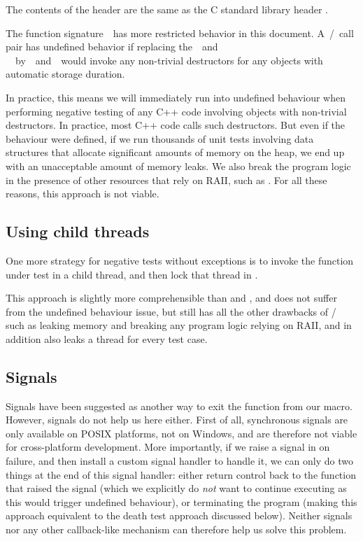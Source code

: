 \begin{adjustwidth}{0.5cm}{0.5cm}
The contents of the header  are the same as the C standard library header .

The function signature  has more restricted behavior in this document. A / call pair has undefined behavior if replacing the  and \\  by  and  would invoke any non-trivial destructors for any objects with automatic storage duration.
\end{adjustwidth}

In practice, this means we will immediately run into undefined behaviour when performing negative testing of any C++ code involving objects with non-trivial destructors. In practice, most C++ code calls such destructors. But even if the behaviour were defined, if we run thousands of unit tests involving data structures that allocate significant amounts of memory on the heap, we end up with an unacceptable amount of memory leaks. We also break the program logic in the presence of other resources that rely on RAII, such as . For all these reasons, this approach is not viable.

\subsection{Using child threads}

One more strategy for negative tests without exceptions is to invoke the function under test in a child thread, and then lock that thread in .

This approach is slightly more comprehensible than  and , and does not suffer from the undefined behaviour issue, but still has all the other drawbacks of / such as leaking memory and breaking any program logic relying on RAII, and in addition also leaks a thread for every test case.


\subsection{Signals}

Signals have been suggested as another way to exit the function from our  macro. However, signals do not help us here either. First of all, synchronous signals are only available on POSIX platforms, not on Windows, and are therefore not viable for cross-platform development. More importantly, if we raise a signal in  on failure, and then install a custom signal handler to handle it, we can only do two things at the end of this signal handler: either return control back to the function that raised the signal (which we explicitly do \emph{not} want to continue executing as this would trigger undefined behaviour), or terminating the program (making this approach equivalent to the death test approach discussed below). Neither signals nor any other callback-like mechanism can therefore help us solve this problem.

